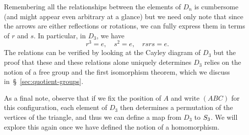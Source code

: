 \begin{example}
\begin{center}
    \end{center}
    Remembering all the relationships between the elements of \(D_n\) is
    cumbersome (and might appear even arbitrary at a glance) but we need only
    note that since the arrows are either reflections or rotations, we can fully
    express them in terms of \(r\) and \(s\). In particular, in \(D_3\), we have
    \[
        r^3 = e, \quad s^2 = e, \quad rsrs = e.
    \]
    The relations can be verified by looking at the Cayley diagram of \(D_3\)
    but the proof that these and these relations alone uniquely determines
    \(D_3\) relies on the notion of a free group and the first isomorphism
    theorem, which we discuss in~\S~\ref{sec:quotient-groups}.

    As a final note, observe that if we fix the position of \(A\) and write
    \((ABC)\) for this configuration, each element of \(D_3\) then determines a
    permutation of the vertices of the triangle, and thus we can define a map
    from \(D_3\) to \(S_{3}\). We will explore this again once we have
    defined the notion of a homomorphism.
\end{example}

